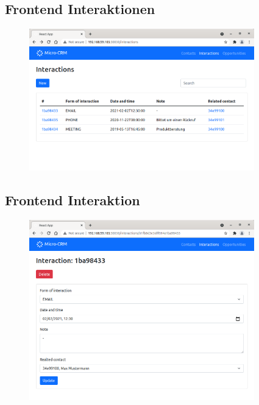 \subsection*{Frontend Interaktionen}

\begin{figure}[H] 
    \centering
    \includegraphics[width=0.87\textwidth]{figures/FrontendInteraktionen.png}
\end{figure}

\subsection*{Frontend Interaktion}

\begin{figure}[H] 
    \centering
    \includegraphics[width=0.87\textwidth]{figures/FrontendInteraktion.png}
\end{figure}

